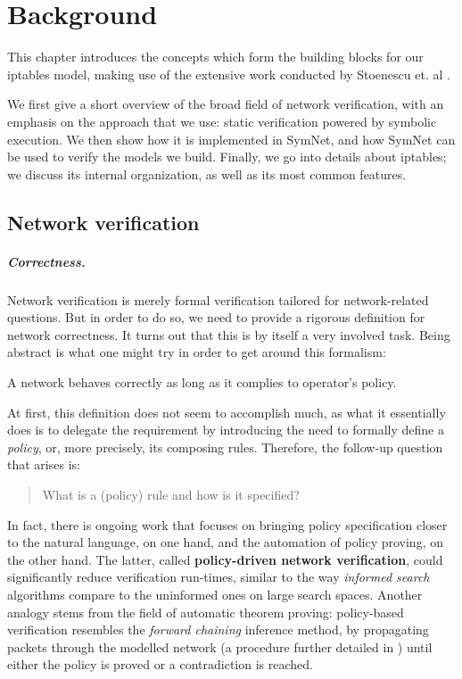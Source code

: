 \chapter{Background}

This chapter introduces the concepts which form the building blocks for our
iptables model, making use of the extensive work conducted by Stoenescu et. al
\cite{stoenescu2013symnet, stoenescu2016symnet}.

We first give a short overview of the broad field of network verification, with
an emphasis on the approach that we use: static verification powered by
symbolic execution.  We then show how it is implemented in SymNet, and how
SymNet can be used to verify the models we build.  Finally, we go into details
about iptables; we discuss its internal organization, as well as its most
common features.

\section{Network verification}\label{sec:network-verification}

\paragraph{Correctness.}\label{par:correctness}
Network verification is merely formal verification tailored for network-related
questions.  But in order to do so, we need to provide a rigorous definition for
network correctness.  It turns out that this is by itself a very involved task.
Being abstract is what one might try in order to get around this formalism:

\begin{definition}
\label{def:full-correctness}
A network behaves correctly as long as it complies to operator's policy.
\end{definition}

At first, this definition does not seem to accomplish much, as what it
essentially does is to delegate the requirement by introducing the need to
formally define a \emph{policy}, or, more precisely, its composing rules.
Therefore, the follow-up question that arises is:

\begin{quote}
What is a (policy) rule and how is it specified?
\end{quote}

In fact, there is ongoing work that focuses on bringing policy specification
closer to the natural language, on one hand, and the automation of policy
proving, on the other hand.  The latter, called \textbf{policy-driven network
verification}, could significantly reduce verification run-times, similar to
the way \emph{informed search} algorithms compare to the uninformed ones on
large search spaces.  Another analogy stems from the field of automatic theorem
proving: policy-based verification resembles the \emph{forward chaining}
inference method, by propagating packets through the modelled network (a
procedure further detailed in ) until
either the policy is proved or a contradiction is reached.

